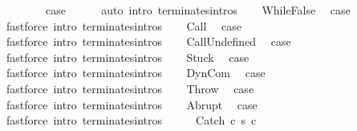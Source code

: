 \begin{isabellebody}
\ \ \isacommand{{\isacharbraceright}}\isamarkupfalse%
\isanewline
\ \ \isamarkupfalse%
\ \isamarkupfalse%
\ {\isacharquery}case\isanewline
\ \ \ \ \isamarkupfalse%
\ {\isacharparenleft}auto\ intro{\isacharcolon}\ terminates{\isachardot}intros{\isacharparenright}\isanewline
{}\isamarkupfalse%
\isanewline
\ \ \isamarkupfalse%
\ WhileFalse\ \isamarkupfalse%
\ {\isacharquery}case\ \isamarkupfalse%
\ {\isacharparenleft}fastforce\ intro{\isacharcolon}\ terminates{\isachardot}intros{\isacharparenright}\isanewline
{}\isamarkupfalse%
\isanewline
\ \ \isamarkupfalse%
\ Call\ \isamarkupfalse%
\ {\isacharquery}case\ \isamarkupfalse%
\ {\isacharparenleft}fastforce\ intro{\isacharcolon}\ terminates{\isachardot}intros{\isacharparenright}\isanewline
{}\isamarkupfalse%
\isanewline
\ \ \isamarkupfalse%
\ CallUndefined\ \isamarkupfalse%
\ {\isacharquery}case\ \isamarkupfalse%
\ {\isacharparenleft}fastforce\ intro{\isacharcolon}\ terminates{\isachardot}intros{\isacharparenright}\isanewline
{}\isamarkupfalse%
\isanewline
\ \ \isamarkupfalse%
\ Stuck\ \isamarkupfalse%
\ {\isacharquery}case\ \isamarkupfalse%
\ {\isacharparenleft}fastforce\ intro{\isacharcolon}\ terminates{\isachardot}intros{\isacharparenright}\isanewline
{}\isamarkupfalse%
\isanewline
\ \ \isamarkupfalse%
\ DynCom\ \isamarkupfalse%
\ {\isacharquery}case\ \isamarkupfalse%
\ {\isacharparenleft}fastforce\ intro{\isacharcolon}\ terminates{\isachardot}intros{\isacharparenright}\isanewline
{}\isamarkupfalse%
\isanewline
\ \ \isamarkupfalse%
\ Throw\ \isamarkupfalse%
\ {\isacharquery}case\ \isamarkupfalse%
\ {\isacharparenleft}fastforce\ intro{\isacharcolon}\ terminates{\isachardot}intros{\isacharparenright}\isanewline
{}\isamarkupfalse%
\isanewline
\ \ \isamarkupfalse%
\ Abrupt\ \isamarkupfalse%
\ {\isacharquery}case\ \isamarkupfalse%
\ {\isacharparenleft}fastforce\ intro{\isacharcolon}\ terminates{\isachardot}intros{\isacharparenright}\isanewline
{}\isamarkupfalse%
\ \isanewline
\ \ \isamarkupfalse%
\ {\isacharparenleft}Catch\ c{}\ s\ c{}{\isacharparenright}\ \isanewline

\end{isabellebody}
